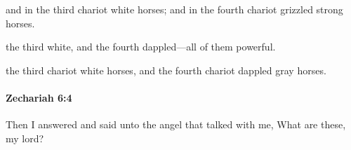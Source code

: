 			\begin{versebox}
					\item[BHS] 
					\item[LXX] 
					\item[ASV] and in the third chariot white horses; and in the fourth chariot grizzled strong horses.
					\item[NIV] the third white, and the fourth dappled—all of them powerful.
					\item[NRSV] the third chariot white horses, and the fourth chariot dappled gray horses.
			\end{versebox}

		\paragraph{Zechariah 6:4} %
			\label{ZECHARIAH-6-4}

			Then I answered and said unto the angel that talked with me, What are these, my lord?

